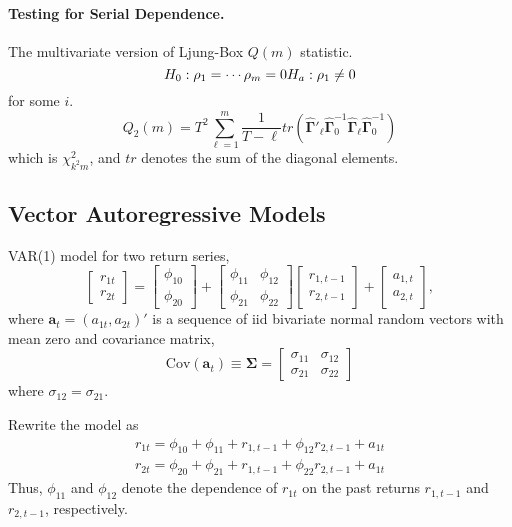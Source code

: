 \paragraph{Testing for Serial Dependence.}
The multivariate version of Ljung-Box $Q(m)$ statistic.
\[
H_0: \mathbf{\rho}_1 = \cdots \mathbf{\rho}_m = 0 \\
H_a: \mathbf{\rho}_1 \ne 0
\]
for some $i$.
\[
Q_2(m)=T^2 \sum^m_{\ell=1} \frac{1}{T-\ell} tr(\hat{\mathbf{\Gamma}}'_{\ell} \hat{\mathbf{\Gamma}}^{-1}_{0} \hat{\mathbf{\Gamma}}_{\ell} \hat{\mathbf{\Gamma}}^{-1}_{0}) 
\]
which is $\chi^2_{k^2 m}$, and $tr$ denotes the sum of the diagonal elements.

\subsection{Vector Autoregressive Models}
VAR(1) model for two return series,
\[
\begin{bmatrix}
r_{1t} \\ r_{2t}
\end{bmatrix}=
\begin{bmatrix}
\phi_{10} \\ \phi_{20}
\end{bmatrix} +
\begin{bmatrix}
\phi_{11} & \phi_{12} \\ 
\phi_{21} & \phi_{22}
\end{bmatrix}
\begin{bmatrix}
r_{1,t-1} \\ r_{2,t-1}
\end{bmatrix} +
\begin{bmatrix}
a_{1,t} \\ a_{2,t}
\end{bmatrix},
\]
where $\mathbf{a}_t=(a_{1t},a_{2t})'$ is a sequence of iid bivariate normal random vectors with mean zero and covariance matrix,
\[
\text{Cov}(\mathbf{a}_t) \equiv \mathbf{\Sigma}=
\begin{bmatrix}
\sigma_{11} & \sigma_{12} \\
\sigma_{21} & \sigma_{22}
\end{bmatrix}
\]
where $\sigma_{12}=\sigma_{21}$.

Rewrite the model as
\begin{eqnarray*}
r_{1t}= \phi_{10} + \phi_{11} + r_{1,t-1} + \phi_{12} r_{2,t-1} + a_{1t} \\
r_{2t}= \phi_{20} + \phi_{21} + r_{1,t-1} + \phi_{22} r_{2,t-1} + a_{1t}
\end{eqnarray*}
Thus, $\phi_{11}$ and $\phi_{12}$ denote the dependence of $r_{1t}$ on the past returns $r_{1,t-1}$ and $r_{2,t-1}$, respectively.


